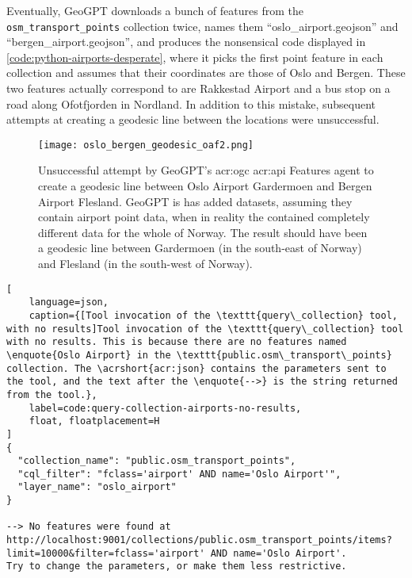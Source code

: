 Eventually, GeoGPT downloads a bunch of features from the \texttt{osm\_transport\_points} collection twice, names them \enquote{oslo\_airport.geojson} and \enquote{bergen\_airport.geojson}, and produces the nonsensical code displayed in \autoref{code:python-airports-desperate}, where it picks the first point feature in each collection and assumes that their coordinates are those of Oslo and Bergen. These two features actually correspond to are Rakkestad Airport and a bus stop on a road along Ofotfjorden in Nordland. In addition to this mistake, subsequent attempts at creating a geodesic line between the locations were unsuccessful.

\begin{figure}[htbp]
    \centering
    \texttt{[image: oslo\_bergen\_geodesic\_oaf2.png]}
    \caption[Unsuccessful attempt by GeoGPT's OGC API Features agent to create a geodesic line between Oslo Airport Gardermoen and Bergen Airport Flesland]{Unsuccessful attempt by GeoGPT's \acrshort{acr:ogc} \acrshort{acr:api} Features agent to create a geodesic line between Oslo Airport Gardermoen and Bergen Airport Flesland. GeoGPT is has added datasets, assuming they contain airport point data, when in reality the contained completely different data for the whole of Norway. The result should have been a geodesic line between Gardermoen (in the south-east of Norway) and Flesland (in the south-west of Norway).}
    \label{fig:oaf-geodesic-unsuccessful}
\end{figure}

\FloatBarrier

\begin{lstlisting}[
    language=json,
    caption={[Tool invocation of the \texttt{query\_collection} tool, with no results]Tool invocation of the \texttt{query\_collection} tool with no results. This is because there are no features named \enquote{Oslo Airport} in the \texttt{public.osm\_transport\_points} collection. The \acrshort{acr:json} contains the parameters sent to the tool, and the text after the \enquote{-->} is the string returned from the tool.},
    label=code:query-collection-airports-no-results,
    float, floatplacement=H
]
{
  "collection_name": "public.osm_transport_points",
  "cql_filter": "fclass='airport' AND name='Oslo Airport'",
  "layer_name": "oslo_airport"
}

--> No features were found at http://localhost:9001/collections/public.osm_transport_points/items?limit=10000&filter=fclass='airport' AND name='Oslo Airport'.
Try to change the parameters, or make them less restrictive.
\end{lstlisting}

